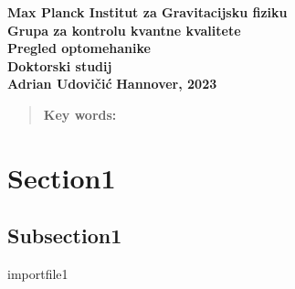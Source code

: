 \documentclass[10pt,leqno]{article}
\begin{document}
\begin{titlepage}
	\begin{center}
		{\large \textbf{Max Planck Institut za Gravitacijsku fiziku}} \\[0.1cm]
		{\large \textbf{Grupa za kontrolu kvantne kvalitete}}\\[0.1cm]
		{\large \textbf{Pregled optomehanike}} \\[0.1cm]
		{\LARGE\textbf{Doktorski studij}}\\[2.5cm]
		\vspace{2cm}
		{\LARGE \textbf{Adrian Udovičić}}
		\vfill
		\large\textbf{{Hannover, 2023} }
	\end{center}
\end{titlepage}

\newpage
{}
\begin{abstract}
	\textbf{Key words:}
\end{abstract}
\newpage
\tableofcontents
\newpage

\section{Section1}
\subsection{Subsection1}
{importfile1}
\newpage


\end{document}
